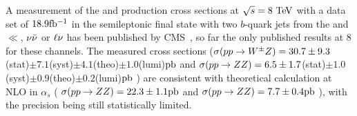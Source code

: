 A  measurement of the \WZ\; and \ZZ\; production cross sections 
at $\rts=8\TeV$ with a data set of $18.9\mbox{fb$^{-1}$}$ 
in the semileptonic final state with two $b$-quark jets from the \Zzero 
and $\ll$, $\nu\bar{\nu}$ or $\ell \nu$ has been published by CMS~\cite{Chatrchyan:2014aqa}, so 
far the only published results at 8 \TeV\; for these channels.
The measured cross sections 
($\sigma(pp\rightarrow W^{\pm}Z)=30.7\pm 9.3$(stat)$\pm 7.1$(syst)$\pm 4.1$(theo)$\pm 1.0$(lumi)$\mbox{pb}$
and
$\sigma(pp\rightarrow ZZ)=6.5\pm 1.7$(stat)$\pm 1.0$(syst)$\pm 0.9$(theo)$\pm 0.2$(lumi)$\mbox{pb}$
) 
are consistent with theoretical calculation at
NLO in $\alpha_s$ 
(
$\sigma(pp\rightarrow ZZ) = 22.3\pm 1.1\mbox{pb}$ and $\sigma(pp\rightarrow ZZ)=7.7\pm 0.4\mbox{pb}$
), 
with the precision being still statistically limited. 

% 







